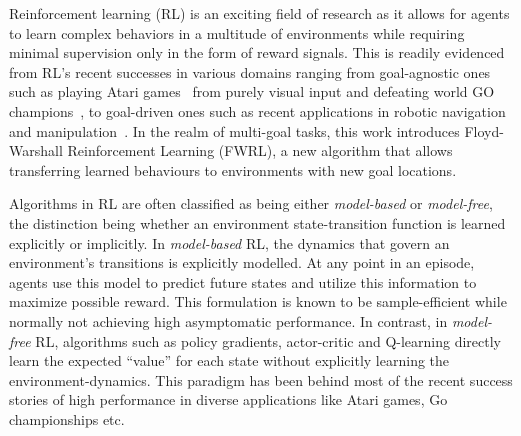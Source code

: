 Reinforcement learning (RL) is an exciting field of research as it allows for
agents to learn complex behaviors in a multitude of environments while requiring
minimal supervision only in the form of reward signals. This is readily
evidenced from RL's recent successes in various domains ranging from goal-agnostic ones such as  
playing Atari games~\cite{MnKaSiNATURE2015} from purely visual input and defeating world GO
champions~\cite{gibney2016google}, to goal-driven ones such as recent
applications in robotic navigation~\cite{mirowski2018learning} and
manipulation~\cite{pong2018temporal}. In the realm of multi-goal tasks, this
work introduces Floyd-Warshall Reinforcement Learning (FWRL), a new algorithm
that allows transferring learned behaviours to environments with new goal
locations.


Algorithms in RL are often classified as being either
\emph{model-based} or \emph{model-free}, the distinction being whether
an environment state-transition function is learned explicitly or
implicitly.  In \emph{model-based} RL, the dynamics that govern an
environment's transitions is explicitly modelled.
At any point in an episode, agents use this model to
predict future states and utilize this information to maximize possible
reward. This formulation is known to be sample-efficient while normally
not achieving high asymptomatic performance.
In contrast, in \emph{model-free} RL, algorithms such as policy gradients,
actor-critic and Q-learning directly learn the expected ``value'' for each
state without explicitly learning the environment-dynamics. This paradigm has
been behind most of the recent success stories of high performance in diverse
applications like Atari games, Go championships etc.

